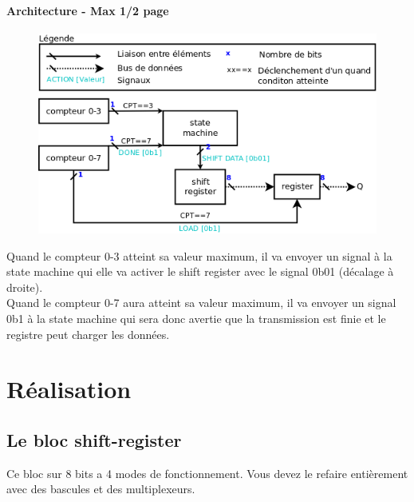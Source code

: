 \documentclass[a4paper]{article} %
\begin{document}
\begin{tcolorbox}[colframe=Monokaimagenta,colback=white]
\paragraph{Architecture - Max 1/2 page}

\begin{figure}[H]
    \centering
    \includegraphics[width=.8\textwidth]{src/schema_bloc.png}
    \label{fig:schem_bloc}
\end{figure}

Quand le compteur 0-3 atteint sa valeur maximum, il va envoyer un signal à la state machine qui elle va activer le shift register avec le signal 0b01 (décalage à droite).\\
Quand le compteur 0-7 aura atteint sa valeur maximum, il va envoyer un signal 0b1 à la state machine qui sera donc avertie que la transmission est finie et le registre peut charger les données.

\end{tcolorbox}

\section {Réalisation}
\subsection{Le bloc shift-register}
Ce bloc sur 8 bits a 4 modes de fonctionnement. Vous devez le refaire entièrement avec des bascules et des multiplexeurs.
\end{document}
